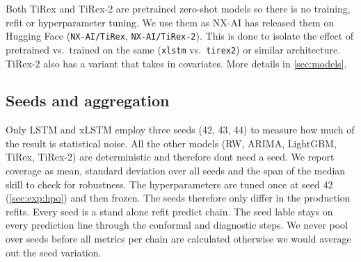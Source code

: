 Both TiRex and TiRex-2 are pretrained zero-shot models so there is no training, refit or hyperparameter tuning. We use them as NX-AI has released them on Hugging Face (\texttt{NX-AI/TiRex}, \texttt{NX-AI/TiRex-2}). This is done to isolate the effect of pretrained vs.\ trained on the same (\texttt{xlstm} vs.\ \texttt{tirex2}) or similar architecture. TiRex-2 also has a variant that takes in covariates. More details in \cref{sec:models}.

\subsection{Seeds and aggregation}
\label{sec:exp:seeds}

%



Only LSTM and xLSTM employ three seeds (42, 43, 44) to measure how much of the result is statistical noise. All the other models (RW, ARIMA, LightGBM, TiRex, TiRex-2) are deterministic and therefore dont need a seed. We report coverage as mean, standard deviation over all seeds and the span of the median skill to check for robustness. The hyperparameters are tuned once at seed 42 (\cref{sec:exp:hpo}) and then frozen. The seeds therefore only differ in the production refits. Every seed is a stand alone refit predict chain. The seed lable stays on every prediction line through the conformal and diagnostic steps. We never pool over seeds before all metrics per chain are calculated otherwise we would average out the seed variation.

